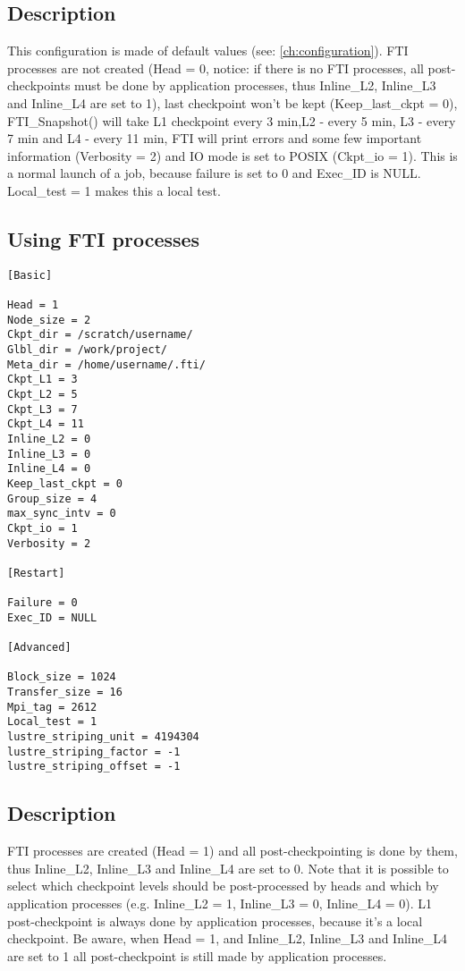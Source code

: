 \documentclass{refrep}
\begin{document}
\subsection*{Description}
This configuration is made of default values (see: \ref{ch:configuration}). FTI processes are not created (Head = 0, notice: if there is no FTI processes, all post-checkpoints must be done by application processes, thus Inline\_L2, Inline\_L3 and Inline\_L4 are set to 1), last checkpoint won't be kept (Keep\_last\_ckpt = 0), FTI\_Snapshot() will take L1 checkpoint every 3 min,L2 - every 5 min, L3 - every 7 min and L4 - every 11 min, FTI will print errors and some few important information (Verbosity = 2) and IO mode is set to POSIX (Ckpt\_io = 1). This is a normal launch of a job, because failure is set to 0 and Exec\_ID is NULL. Local\_test = 1 makes this a local test.
\newpage
\subsection{Using FTI processes}\label{subsec:configftiprocces}
\begin{center}
\begin{lstlisting}[frame=single]
[Basic]

Head = 1
Node_size = 2
Ckpt_dir = /scratch/username/
Glbl_dir = /work/project/
Meta_dir = /home/username/.fti/
Ckpt_L1 = 3
Ckpt_L2 = 5
Ckpt_L3 = 7
Ckpt_L4 = 11
Inline_L2 = 0
Inline_L3 = 0
Inline_L4 = 0
Keep_last_ckpt = 0
Group_size = 4
max_sync_intv = 0
Ckpt_io = 1
Verbosity = 2

[Restart]

Failure = 0
Exec_ID = NULL

[Advanced]

Block_size = 1024
Transfer_size = 16
Mpi_tag = 2612
Local_test = 1
lustre_striping_unit = 4194304 
lustre_striping_factor = -1 
lustre_striping_offset = -1 

\end{lstlisting}
\end{center}
\subsection*{Description}
FTI processes are created (Head = 1) and all post-checkpointing is done by them, thus Inline\_L2, Inline\_L3 and Inline\_L4 are set to 0. Note that it is possible to select which checkpoint levels should be post-processed by heads and which by application processes (e.g. Inline\_L2 = 1, Inline\_L3 = 0, Inline\_L4 = 0). L1 post-checkpoint is always done by application processes, because it's a local checkpoint. Be aware, when Head = 1, and Inline\_L2, Inline\_L3 and Inline\_L4 are set to 1 all post-checkpoint is still made by application processes.
\newpage
\end{document}
